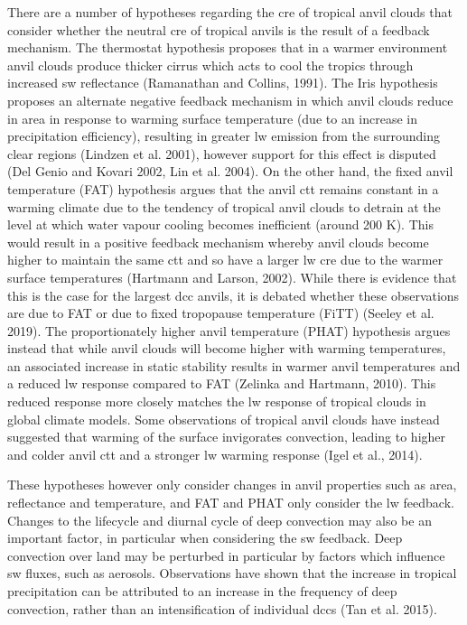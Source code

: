There are a number of hypotheses regarding the \acrshort{cre} of tropical anvil clouds that consider whether the neutral \acrshort{cre} of tropical anvils is the result of a feedback mechanism. 
The thermostat hypothesis proposes that in a warmer environment anvil clouds produce thicker cirrus which acts to cool the tropics through increased \acrshort{sw} reflectance (Ramanathan and Collins, 1991). 
The Iris hypothesis proposes an alternate negative feedback mechanism in which anvil clouds reduce in area in response to warming surface temperature (due to an increase in precipitation efficiency), resulting in greater \acrshort{lw} emission from the surrounding clear regions (Lindzen et al. 2001), however support for this effect is disputed (Del Genio and Kovari 2002, Lin et al. 2004). 
On the other hand, the fixed anvil temperature (FAT) hypothesis argues that the anvil \acrshort{ctt} remains constant in a warming climate due to the tendency of tropical anvil clouds to detrain at the level at which water vapour cooling becomes inefficient (around 200 K). This would result in a positive feedback mechanism whereby anvil clouds become higher to maintain the same \acrshort{ctt} and so have a larger \acrshort{lw} \acrshort{cre} due to the warmer surface temperatures (Hartmann and Larson, 2002). 
While there is evidence that this is the case for the largest \acrshort{dcc} anvils, it is debated whether these observations are due to FAT or due to fixed tropopause temperature (FiTT) (Seeley et al. 2019). 
The proportionately higher anvil temperature (PHAT) hypothesis argues instead that while anvil clouds will become higher with warming temperatures, an associated increase in static stability results in warmer anvil temperatures and a reduced \acrshort{lw} response compared to FAT (Zelinka and Hartmann, 2010). 
This reduced response more closely matches the \acrshort{lw} response of tropical clouds in global climate models. 
Some observations of tropical anvil clouds have instead suggested that warming of the surface invigorates convection, leading to higher and colder anvil \acrshort{ctt} and a stronger \acrshort{lw} warming response (Igel et al., 2014).

These hypotheses however only consider changes in anvil properties such as area, reflectance and temperature, and FAT and PHAT only consider the \acrshort{lw} feedback. 
Changes to the lifecycle and diurnal cycle of deep convection may also be an important factor, in particular when considering the \acrshort{sw} feedback. 
Deep convection over land may be perturbed in particular by factors which influence \acrshort{sw} fluxes, such as aerosols. 
Observations have shown that the increase in tropical precipitation can be attributed to an increase in the frequency of deep convection, rather than an intensification of individual \acrshort{dcc}s (Tan et al. 2015).

